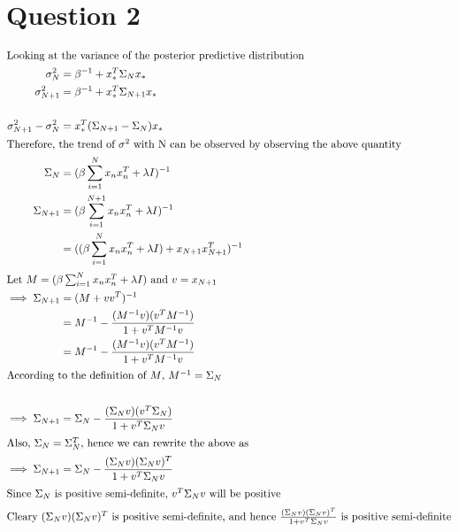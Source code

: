 \documentclass{article}
\begin{document}
\clearpage


\section*{Question 2}
\begin{addmargin}{1.5em}

    \begin{align*}
        \shortintertext{Looking at the variance of the posterior predictive distribution}
        \sigma_{N}^2                    &= \beta^{-1} + x_*^T\Sigma_{N}x_* \\
        \sigma_{N + 1}^2                &= \beta^{-1} + x_*^T\Sigma_{N + 1}x_* \\
        \\
        \sigma_{N + 1}^2 - \sigma_{N}^2 &= x_*^T(\Sigma_{N + 1} - \Sigma_{N})x_* \\
        \shortintertext{Therefore, the trend of $\sigma^2$ with N can be observed by observing the above quantity}
        \Sigma_{N}                      &= (\beta\sum_{i = 1}^{N} x_nx_n^T + \lambda I)^{-1} \\
        \Sigma_{N + 1}                  &= (\beta\sum_{i = 1}^{N + 1} x_nx_n^T + \lambda I)^{-1} \\
                                        &= ((\beta\sum_{i = 1}^{N} x_nx_n^T + \lambda I) + x_{N + 1}x_{N + 1}^T)^{-1} \\
        \shortintertext{Let $M = (\beta\sum_{i = 1}^{N} x_nx_n^T + \lambda I)$ and $v = x_{N + 1}$}
        \implies \Sigma_{N + 1}         &= (M + vv^T)^{-1} \\
                                        &= M^{-1} - \frac{(M^{-1}v)(v^TM^{-1})}{1 + v^TM^{-1}v} \\
                                        &= M^{-1} - \frac{(M^{-1}v)(v^TM^{-1})}{1 + v^TM^{-1}v} \\
        \shortintertext{According to the definition of $M$, $M^{-1} = \Sigma_N$} \\
        \implies \Sigma_{N + 1}         &= \Sigma_N - \frac{(\Sigma_Nv)(v^T\Sigma_N)}{1 + v^T\Sigma_Nv} \\
        \shortintertext{Also, $\Sigma_N = \Sigma_N^T$, hence we can rewrite the above as}
        \implies \Sigma_{N + 1}         &= \Sigma_N - \frac{(\Sigma_Nv)(\Sigma_Nv)^T}{1 + v^T\Sigma_Nv} \\
        \shortintertext{Since $\Sigma_N$ is positive semi-definite, $v^T\Sigma_Nv$ will be positive} \shortintertext{Cleary $(\Sigma_Nv)(\Sigma_Nv)^T$ is positive semi-definite, and hence $\frac{(\Sigma_Nv)(\Sigma_Nv)^T}{1 + v^T\Sigma_Nv}$ is positive semi-definite}

\end{align*}
\end{addmargin}
\end{document}
